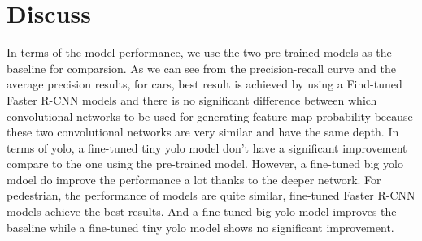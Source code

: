 \section{Discuss}
In terms of the model performance, we use the two pre-trained 
models as the baseline for comparsion.
As we can see from the precision-recall curve and the average precision results, for cars, best result is achieved by 
using a Find-tuned Faster R-CNN models and there is 
no significant difference between which convolutional networks 
to be used for generating feature map probability because 
these two convolutional networks are very similar 
and have the same depth.
In terms of yolo, 
a fine-tuned tiny yolo model don't have a significant 
improvement compare to the one using the pre-trained model.
However, a fine-tuned big yolo mdoel do improve the performance 
a lot thanks to the deeper network.
For pedestrian, the performance of models are quite similar,
fine-tuned Faster R-CNN models achieve the best results. 
And a fine-tuned big yolo model improves the baseline while 
a fine-tuned tiny yolo model shows no significant improvement.
